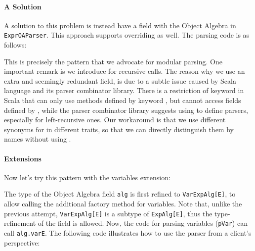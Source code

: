 
\paragraph{A Solution}
A solution to this problem is instead have a field with the Object Algebra
in \lstinline{ExprOAParser}. This approach supports overriding as well.
The parsing code is as follows:

This is precisely the pattern that we advocate for modular parsing.
One important remark is we introduce  for recursive calls.
The reason why we use an extra and seemingly redundant field, is due to a subtle issue caused by Scala language and its parser combinator library. There is a restriction of  keyword in Scala that  can only use methods defined by keyword , but cannot access fields defined by , while the parser combinator library suggests using  to define parsers, especially for left-recursive ones. Our workaround is that we use different synonyms for  in different traits, so that we can directly distinguish them by names without using .

\paragraph{Extensions}
Now let's try this pattern with the variables extension:


\noindent The type of the Object Algebra field \lstinline{alg} is first refined
to \lstinline{VarExpAlg[E]}, to allow calling the additional factory method
for variables. Note that, unlike the previous attempt, \lstinline{VarExpAlg[E]}
is a subtype of \lstinline{ExpAlg[E]}, thus the type-refinement of the
field is allowed. Now, the code for parsing variables (\lstinline{pVar}) can
call \lstinline{alg.varE}. The following code illustrates how to use
the parser from a client's perspective:


